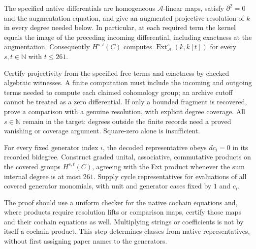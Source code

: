 \begin{proposition}
  \label{prop:lin-native-resolution-correct}
  \notready
  The specified native differentials are homogeneous $\mathcal A$-linear
  maps, satisfy $\partial^2=0$ and the augmentation equation, and give an
  augmented projective resolution of $k$ in every degree needed below.
  In particular, at each required term the kernel equals the image of the
  preceding incoming differential, including exactness at the augmentation.
  Consequently $H^{s,t}(C)$ computes
  $\operatorname{Ext}_{\mathcal A}^s(k,k[t])$ for every $s,t\in\mathbb N$
  with $t\le261$.

  Certify projectivity from the specified free terms and exactness by
  checked algebraic witnesses. A finite computation must include the
  incoming and outgoing terms needed to compute each claimed cohomology
  group; an archive cutoff cannot be treated as a zero differential.
  If only a bounded fragment is recovered, prove a comparison with a
  genuine resolution, with explicit degree coverage. All $s\in\mathbb N$
  remain in the target: degrees outside the finite records need a proved
  vanishing or coverage argument. Square-zero alone is insufficient.
\end{proposition}

\begin{proposition}
  \label{prop:lin-native-generator-classes}
  \notready
  For every fixed generator index $i$, the decoded representative obeys
  $dc_i=0$ in its recorded bidegree. Construct graded unital,
  associative, commutative products on the covered groups $H^{s,t}(C)$,
  agreeing with the Ext product whenever the sum internal degree is at
  most $261$. Supply cycle representatives for evaluations of all covered
  generator monomials, with unit and generator cases fixed by $1$ and $c_i$.

  The proof should use a uniform checker for the native cochain equations
  and, where products require resolution lifts or comparison maps,
  certify those maps and their cochain equations as well. Multiplying
  strings or coefficients is not by itself a cochain product. This step
  determines classes from native representatives, without first assigning
  paper names to the generators.
\end{proposition}

